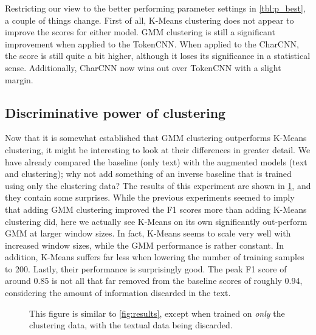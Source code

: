 Restricting our view to the better performing parameter settings in
\cref{tbl:p_best}, a couple of things change. First of all, K-Means clustering
does not appear to improve the scores for either model. GMM clustering is still
a significant improvement when applied to the TokenCNN. When applied to
the CharCNN, the score is still quite a bit higher, although it loses its
significance in a statistical sense. Additionally, CharCNN now wins out over
TokenCNN with a slight margin.

\subsection*{Discriminative power of clustering}
Now that it is somewhat established that GMM clustering outperforms K-Means
clustering, it might be interesting to look at their differences in greater
detail. We have already compared the baseline (only text) with the augmented
models (text and clustering); why not add something of an inverse baseline that
is trained using only the clustering data? The results of this experiment are
shown in \cref{fig:only_clusters}, and they contain some surprises. While the
previous experiments seemed to imply that adding GMM clustering improved the F1
scores more than adding K-Means clustering did, here we actually see K-Means on
its own significantly out-perform GMM at larger window sizes. In fact, K-Means
seems to scale very well with increased window sizes, while the GMM performance
is rather constant. In addition, K-Means suffers far less when lowering the
number of training samples to 200. Lastly, their performance is surprisingly
good. The peak F1 score of around 0.85 is not all that far removed from the
baseline scores of roughly 0.94, considering the amount of information discarded
in the text.

\begin{figure}[tb]
  \centering
  \caption{This figure is similar to \cref{fig:results}, except when trained on
	\emph{only} the clustering data, with the textual data being
	discarded.\label{fig:only_clusters}}
\end{figure}


